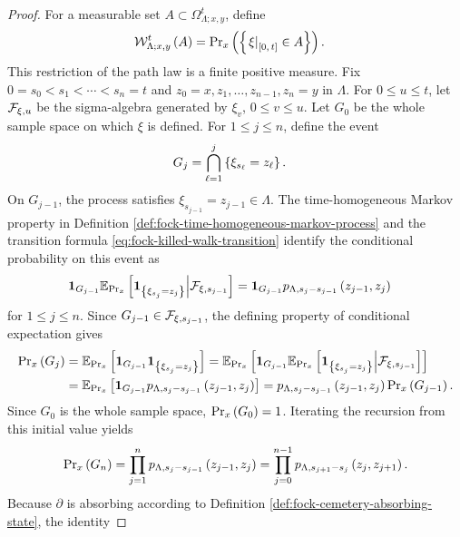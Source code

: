 \documentclass[11pt,a4paper]{article}
\theoremstyle{plain}
\theoremstyle{definition}
\theoremstyle{remark}
\begin{document}
\begin{proof}
For a measurable set $A\subset\Omega_{\Lambda;x,y}^{t}$, define
$$\begin{aligned}
\mathcal{W}_{\Lambda;x,y}^{t} \left( A \right)
& =
\mathrm{Pr}_x \left( 
\left\{ \left. \xi \right|_{\left[ 0,\,t \right]}\in A \right\} \right).
\end{aligned}$$
This restriction of the path law is a finite positive measure.
Fix $0=s_0<s_1<\cdots<s_n=t$ and
$z_0=x,z_1,\ldots,z_{n-1},z_n=y$ in $\Lambda$.
For $0\leq u\leq t$, let $\mathcal{F}_{\xi,u}$ be the sigma-algebra generated by
$\xi_v$, $0\leq v\leq u$.
Let $G_0$ be the whole sample space on which $\xi$ is defined.
For $1\leq j\leq n$, define the event
$$\begin{aligned}
G_j
& =
\bigcap_{\ell=1}^{j}
\left\{ \xi_{s_{\ell}}=z_{\ell} \right\}.
\end{aligned}$$
On $G_{j-1}$, the process satisfies
$\xi_{s_{j-1}}=z_{j-1}\in\Lambda$.
The time-homogeneous Markov property in
Definition \ref{def:fock-time-homogeneous-markov-process} and the transition formula
\eqref{eq:fock-killed-walk-transition} identify the conditional probability on this event as
$$\begin{aligned}
\boldsymbol{1}_{G_{j-1}}
\mathbb{E}_{\mathrm{Pr}_x} \left[ 
\boldsymbol{1}_{\left\{ \xi_{s_j}=z_j \right\}}
 \middle| \mathcal{F}_{\xi,s_{j-1}} \right]
& =
\boldsymbol{1}_{G_{j-1}}
p_{\Lambda,s_j-s_{j-1}} \left( z_{j-1},z_j \right)
\end{aligned}$$
for $1\leq j\leq n$.
Since $G_{j-1}\in\mathcal{F}_{\xi,s_{j-1}}$, the defining property of conditional expectation gives
$$\begin{aligned}
\mathrm{Pr}_x \left( G_j \right)
& =
\mathbb{E}_{\mathrm{Pr}_x} \left[ 
\boldsymbol{1}_{G_{j-1}}
\boldsymbol{1}_{\left\{ \xi_{s_j}=z_j \right\}}
 \right]
=
\mathbb{E}_{\mathrm{Pr}_x} \left[ 
\boldsymbol{1}_{G_{j-1}}
\mathbb{E}_{\mathrm{Pr}_x} \left[ 
\boldsymbol{1}_{\left\{ \xi_{s_j}=z_j \right\}}
 \middle| \mathcal{F}_{\xi,s_{j-1}} \right]
 \right]
\\
& =
\mathbb{E}_{\mathrm{Pr}_x} \left[ 
\boldsymbol{1}_{G_{j-1}}
p_{\Lambda,s_j-s_{j-1}} \left( z_{j-1},z_j \right)
 \right]
=
p_{\Lambda,s_j-s_{j-1}} \left( z_{j-1},z_j \right)
\mathrm{Pr}_x \left( G_{j-1} \right).
\end{aligned}$$
Since $G_0$ is the whole sample space, $\mathrm{Pr}_x \left( G_0 \right)=1$.
Iterating the recursion from this initial value yields
$$\begin{aligned}
\mathrm{Pr}_x \left( G_n \right)
=
\prod_{j=1}^{n}
p_{\Lambda,s_j-s_{j-1}} \left( z_{j-1},z_j \right)
=
\prod_{j=0}^{n-1}
p_{\Lambda,s_{j+1}-s_j} \left( z_j,z_{j+1} \right).
\end{aligned}$$
Because $\partial$ is absorbing according to Definition \ref{def:fock-cemetery-absorbing-state}, the identity

\end{proof}
\end{document}
